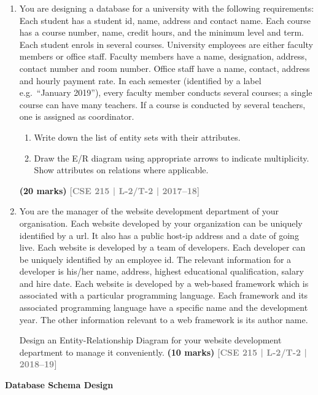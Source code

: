 \documentclass[12pt,a3paper]{article}
\newcommand{\yr}[1]{\hfill\textcolor{gray}{\small\textbf{[#1]}}}
\newcommand{\mk}[1]{\textcolor{orange!70!black}{\small\textbf{(#1 marks)}}}
\newcommand{\subtopic}[2]{%
  \vspace{10pt}
  \noindent\begin{tcolorbox}[colback=#1!8,colframe=#1,boxrule=0.6pt,arc=4pt,
    left=6pt,right=6pt,top=4pt,bottom=4pt]
    \small\bfseries\textcolor{#1}{#2}
  \end{tcolorbox}
  \vspace{2pt}
}
\begin{document}
\begin{enumerate}
\item You are designing a database for a university with the following requirements: Each student has a student id, name, address and contact name. Each course has a course number, name, credit hours, and the minimum level and term. Each student enrols in several courses. University employees are either faculty members or office staff. Faculty members have a name, designation, address, contact number and room number. Office staff have a name, contact, address and hourly payment rate. In each semester (identified by a label e.g.\ ``January 2019''), every faculty member conducts several courses; a single course can have many teachers. If a course is conducted by several teachers, one is assigned as coordinator.
\begin{enumerate}
  \item Write down the list of entity sets with their attributes.
  \item Draw the E/R diagram using appropriate arrows to indicate multiplicity. Show attributes on relations where applicable.
\end{enumerate}
\mk{20} \yr{CSE 215 | L-2/T-2 | 2017--18}

\item You are the manager of the website development department of your organisation.
Each website developed by your organization can be uniquely identified by a url. It also has
a public host-ip address and a date of going live. Each website is developed by a team of
developers. Each developer can be uniquely identified by an employee id. The relevant information
for a developer is his/her name, address, highest educational qualification, salary
and hire date. Each website is developed by a web-based framework which is associated
with a particular programming language. Each framework and its associated programming
language have a specific name and the development year. The other information relevant
to a web framework is its author name.

Design an Entity-Relationship Diagram for your website development department to manage it conveniently. 
\mk{10} \yr{CSE 215 | L-2/T-2 | 2018--19}

\end{enumerate}

\subtopic{cA}{Database Schema Design}
\label{sub:s2-schema}
\end{document}
